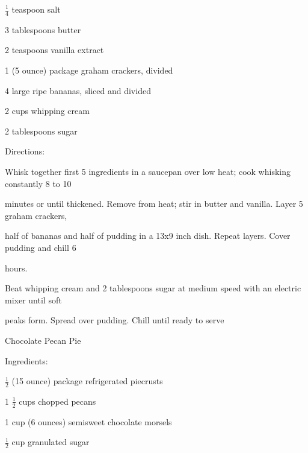 \documentclass[a4paper,portrait,12pt]{book}
\begin{document}
$\frac{1}{4}$ teaspoon salt




3 tablespoons butter




2 teaspoons vanilla extract




1 (5 ounce) package graham crackers, divided




4 large ripe bananas, sliced and divided




2 cups whipping cream




2 tablespoons sugar




Directions:




Whisk together first 5 ingredients in a saucepan over low heat; cook whisking constantly 8 to 10




minutes or until thickened. Remove from heat; stir in butter and vanilla. Layer 5 graham crackers,




half of bananas and half of pudding in a 13x9 inch dish. Repeat layers. Cover pudding and chill 6




hours.




Beat whipping cream and 2 tablespoons sugar at medium speed with an electric mixer until soft




peaks form. Spread over pudding. Chill until ready to serve







\newpage
Chocolate Pecan Pie




Ingredients:




$\frac{1}{2}$ (15 ounce) package refrigerated piecrusts




1 $\frac{1}{2}$ cups chopped pecans




1 cup (6 ounces) semisweet chocolate morsels




$\frac{1}{2}$ cup granulated sugar
\end{document}
